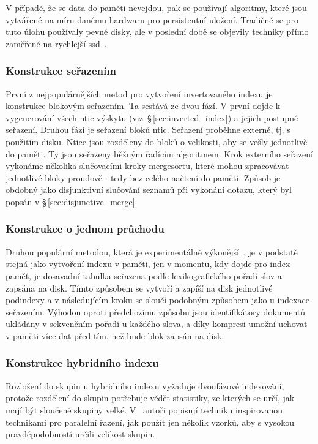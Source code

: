 \documentclass[11pt,letterpaper,oneside,openright]{book}
\begin{document}
V případě, že se data do paměti nevejdou, pak se používají algoritmy, které
jsou vytvářené na míru danému hardwaru pro persistentní uložení. Tradičně se
pro tuto úlohu používaly pevné disky, ale v poslední době se objevily techniky
přímo zaměřené na rychlejší ssd~\cite{Jung201525}.

\subsubsection{Konstrukce seřazením}
První z nejpopulárnějších metod pro vytvoření invertovaného indexu je
konstrukce blokovým seřazením. Ta sestává ze dvou fází.  V první dojde k
vygenerování všech ntic výskytu (viz~\S\,\ref{sec:inverted_index}) a jejich
postupné seřazení. Druhou fází je seřazení bloků ntic. Seřazení proběhne
externě, tj. s použitím disku. Ntice jsou rozděleny do bloků o velikosti, aby
se vešly jednotlivě do paměti. Ty jsou seřazeny běžným řadícím algoritmem. Krok
externího seřazení vykonáme několika slučovacími kroky mergesortu, které mohou
zpracovávat jednotlivé bloky proudově - tedy bez celého načtení do paměti.
Způsob je obdobný jako disjunktivní slučování seznamů při vykonání dotazu,
který byl popsán v \S\,\ref{sec:disjunctive_merge}.

\subsubsection{Konstrukce o jednom průchodu}
Druhou populární metodou, která je experimentálně
výkonější~\cite{Heinz:2003:ESI:873988.873992}, je v podstatě stejná jako
vytvoření indexu v paměti, jen v momentu, kdy dojde pro index paměť, je
dosavadní tabulka seřazena podle lexikografického pořadí slov a zapsána na
disk. Tímto způsobem se vytvoří a zapíší na disk jednotlivé podindexy a v
následujícím kroku se sloučí podobným způsobem jako u indexace seřazením.
Výhodou oproti předchozímu způsobu jsou identifikátory dokumentů ukládány v
sekvenčním pořadí u každého slova, a díky kompresi umožní uchovat v paměti více
dat před tím, než bude blok zapsán na disk.

\subsubsection{Konstrukce hybridního indexu}
Rozložení do skupin u hybridního indexu vyžaduje dvoufázové indexování, protože
rozdělení do skupin potřebuje vědět statistiky, ze kterých se určí, jak mají
být sloučené skupiny velké. V~\cite{Bast:2011:FCH:1993036.1993040} autoři
popisují techniku inspirovanou technikami pro paralelní řazení, jak použít jen
několik vzorků, aby s vysokou pravděpodobností určili velikost skupin.
\end{document}

